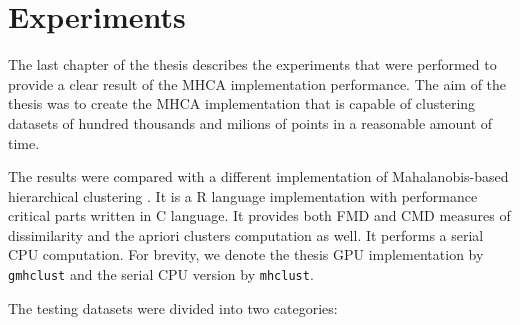 \chapter{Experiments}

The last chapter of the thesis describes the experiments that were performed to provide a clear result of the MHCA implementation performance. The aim of the thesis was to create the MHCA implementation that is capable of clustering datasets of hundred thousands and milions of points in a reasonable amount of time.

The results were compared with a different implementation of Mahalanobis-based hierarchical clustering \cite{fivser2012detection}. It is a R language implementation with performance critical parts written in C language. It provides both FMD and CMD measures of dissimilarity and the apriori clusters computation as well. It performs a serial CPU computation. For brevity, we denote the thesis GPU implementation by \texttt{gmhclust} and the serial CPU version by \texttt{mhclust}.

The testing datasets were divided into two categories:

